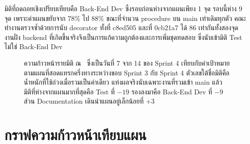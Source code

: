 มิติที่ถดถอยเชิงเปรียบเทียบคือ Back-End Dev ซึ่งรอบก่อนห่างจากแผนเพียง 1 จุด รอบนี้ห่าง 9 จุด เพราะค่าแผนขยับจาก 78\% ไป 88\% ขณะที่จำนวน procedure บน main เท่าเดิมทุกตัว คณะทำงานตรวจซ้ำด้วยการนับ decorator ทั้งที่ c8ed505 และที่ 0cb21a7 ได้ 86 เท่ากันทั้งสองจุด งานฝั่ง backend ที่เกิดขึ้นจริงจึงเป็นการแก้ความถูกต้องและการเพิ่มชุดทดสอบ ซึ่งนับเข้ามิติ Test ไม่ใช่ Back-End Dev

\begin{figure}[H]
\centering
{}
\vspace{0.6em}
\caption{ความก้าวหน้ารายมิติ ณ \reportdate\ ซึ่งเป็นวันที่ 7 จาก 14 ของ Sprint 4
 เทียบกับค่าเป้าหมายตามแผนที่สอดแทรกครึ่งทางระหว่างขอบ Sprint 3 กับ Sprint 4
 ตัวเลขใต้ชื่อมิติคือน้ำหนักที่ใช้ถ่วงเมื่อรวมเป็นค่าเดียว
 แท่งผลจริงนับเฉพาะงานที่รวมเข้า main แล้ว
 มิติที่ห่างจากแผนมากที่สุดคือ Test ที่ $-19$ รองลงมาคือ Back-End Dev ที่ $-9$
 ส่วน Documentation เดินนำแผนอยู่เล็กน้อยที่ $+3$}
\label{fig:dims}
\end{figure}

\clearpage
\section{กราฟความก้าวหน้าเทียบแผน}

